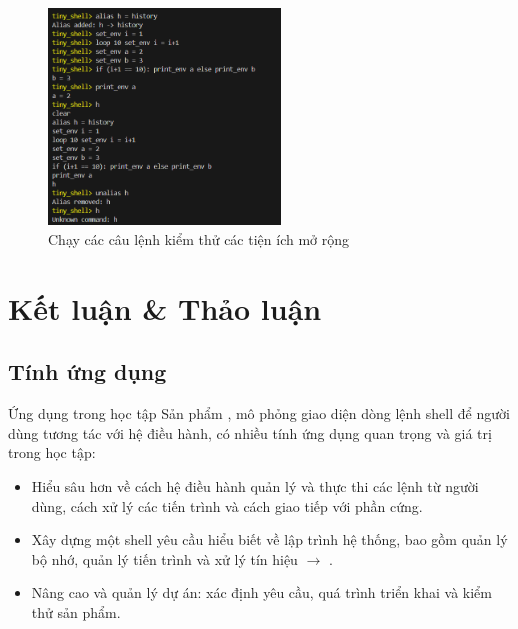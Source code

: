 \begin{frame}
\begin{figure}
    \centering
    \includegraphics[width=0.55\textwidth]{images/11.png}
    \caption{Chạy các câu lệnh kiểm thử các tiện ích mở rộng}
    \label{fig:enter-label}
\end{figure}
\end{frame}

\section{Kết luận \& Thảo luận}

\subsection{Tính ứng dụng}

\begin{frame}{Ứng dụng trong học tập}
Sản phẩm , mô phỏng giao diện dòng lệnh shell để người dùng tương tác với hệ điều hành, có nhiều tính ứng dụng quan trọng và giá trị trong học tập:
\vspace{5 pt}
\begin{itemize}
    \item Hiểu sâu hơn về cách hệ điều hành quản lý và thực thi các lệnh từ người dùng, cách xử lý các tiến trình và cách giao tiếp với phần cứng.
    \item Xây dựng một shell yêu cầu hiểu biết về lập trình hệ thống, bao gồm quản lý bộ nhớ, quản lý tiến trình và xử lý tín hiệu $\to$ .
    \item Nâng cao  và quản lý dự án: xác định yêu cầu, quá trình triển khai và kiểm thử sản phẩm.
\end{itemize}
\end{frame}

